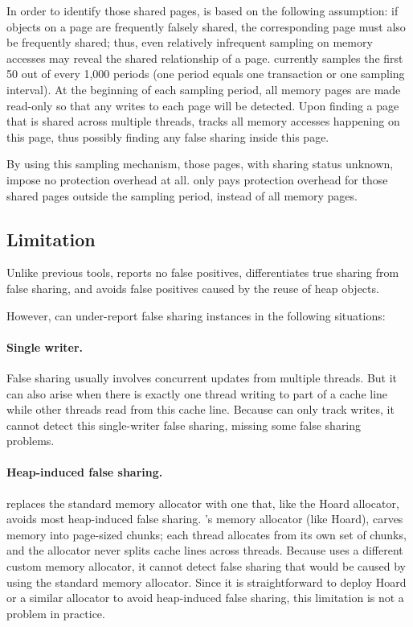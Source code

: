 In order to identify those shared pages, \SheriffDetect{} is based on the following assumption: if objects on a page are frequently falsely shared, the corresponding page must also be frequently shared; thus, even relatively infrequent sampling on memory accesses may reveal the shared relationship of a page. \SheriffDetect{} currently samples the first 50 out of every 1,000 periods (one period equals one transaction or one sampling interval). At the beginning of each sampling period, all memory pages are made read-only so that any
writes to each page will be detected. Upon finding a page that is shared across multiple threads, \SheriffDetect{} tracks all memory accesses happening on this page, thus possibly finding any false sharing inside this page. 

By using this sampling mechanism, those pages, with sharing status unknown, impose no protection overhead at all. \sheriffDetect{} only pays protection overhead for those shared pages outside the sampling period, instead of all memory pages. 

\subsection{Limitation}
\label{discussion:faultofdetect}

Unlike previous tools, \SheriffDetect{} reports no false positives, differentiates true sharing from false sharing, and avoids false positives caused by the reuse of heap objects. 

However, \SheriffDetect{} can under-report false sharing instances in the following situations:

\paragraph{Single writer.}
False sharing usually involves concurrent updates from multiple threads. But it can also arise when there is exactly one thread writing to part of a cache line while other threads read from this cache line. 
Because \sheriffdetect{} can only track writes, it cannot detect this single-writer false sharing, missing some false sharing problems. 

\paragraph{Heap-induced false sharing.}  
\sheriff{} replaces the standard memory allocator with one that, like the Hoard allocator, avoids most heap-induced false sharing. \sheriff{}'s memory allocator (like Hoard), carves memory into page-sized chunks; each thread allocates from its own set of chunks, and the allocator never splits cache lines across threads. Because \SheriffDetect{} uses a different custom memory allocator, it cannot detect false sharing that would be caused by using the standard memory allocator. Since it is straightforward to deploy Hoard or a similar allocator to avoid heap-induced false sharing, this limitation is not a problem in practice.

